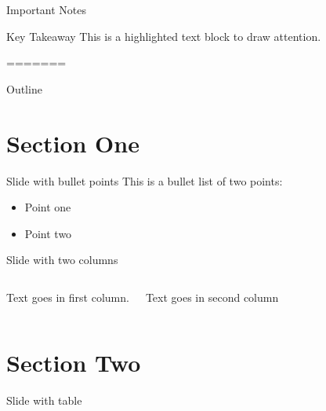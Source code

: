 \documentclass{beamer}
\begin{document}
\begin{frame}{Important Notes}
    \begin{block}{Key Takeaway}
        This is a highlighted text block to draw attention.
    \end{block}
=======
\begin{frame}
  \titlepage
\end{frame}

\begin{frame}{Outline}
  \tableofcontents
\end{frame}

%

\section{Section One}

\begin{frame}{Slide with bullet points}
	This is a bullet list of two points:
    \begin{itemize}
		\item Point one
        \item Point two
	\end{itemize}
\end{frame}

\begin{frame}{Slide with two columns}
	\begin{columns}
        Text goes in first column.
        
        Text goes in second column
	\end{columns}
\end{frame}

\section{Section Two}

\begin{frame}{Slide with table}
	
\end{frame}


\end{frame}
\end{document}
